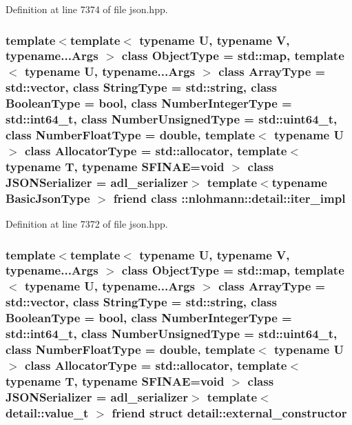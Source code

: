 Definition at line 7374 of file json.\+hpp.

\subsubsection[{\texorpdfstring{\+::nlohmann\+::detail\+::iter\+\_\+impl}{::nlohmann::detail::iter_impl}}]{\setlength{\rightskip}{0pt plus 5cm}template$<$template$<$ typename U, typename V, typename...\+Args $>$ class Object\+Type = std\+::map, template$<$ typename U, typename...\+Args $>$ class Array\+Type = std\+::vector, class String\+Type  = std\+::string, class Boolean\+Type  = bool, class Number\+Integer\+Type  = std\+::int64\+\_\+t, class Number\+Unsigned\+Type  = std\+::uint64\+\_\+t, class Number\+Float\+Type  = double, template$<$ typename U $>$ class Allocator\+Type = std\+::allocator, template$<$ typename T, typename S\+F\+I\+N\+A\+E=void $>$ class J\+S\+O\+N\+Serializer = adl\+\_\+serializer$>$ template$<$typename Basic\+Json\+Type $>$ friend class \+::{\bf nlohmann\+::detail\+::iter\+\_\+impl}\hspace{0.3cm}{\ttfamily [friend]}}\hypertarget{classnlohmann_1_1basic__json_a842e5c7ca096025c18b11e715d3401f4}{}\label{classnlohmann_1_1basic__json_a842e5c7ca096025c18b11e715d3401f4}


Definition at line 7372 of file json.\+hpp.

\subsubsection[{\texorpdfstring{detail\+::external\+\_\+constructor}{detail::external_constructor}}]{\setlength{\rightskip}{0pt plus 5cm}template$<$template$<$ typename U, typename V, typename...\+Args $>$ class Object\+Type = std\+::map, template$<$ typename U, typename...\+Args $>$ class Array\+Type = std\+::vector, class String\+Type  = std\+::string, class Boolean\+Type  = bool, class Number\+Integer\+Type  = std\+::int64\+\_\+t, class Number\+Unsigned\+Type  = std\+::uint64\+\_\+t, class Number\+Float\+Type  = double, template$<$ typename U $>$ class Allocator\+Type = std\+::allocator, template$<$ typename T, typename S\+F\+I\+N\+A\+E=void $>$ class J\+S\+O\+N\+Serializer = adl\+\_\+serializer$>$ template$<$detail\+::value\+\_\+t $>$ friend struct {\bf detail\+::external\+\_\+constructor}\hspace{0.3cm}{\ttfamily [friend]}}\hypertarget{classnlohmann_1_1basic__json_a6275ed57bae6866cdf5db5370a7ad47c}{}\label{classnlohmann_1_1basic__json_a6275ed57bae6866cdf5db5370a7ad47c}


